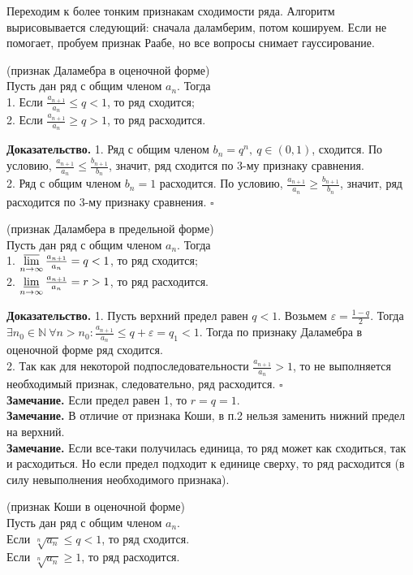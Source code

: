 Переходим к более тонким признакам сходимости ряда. Алгоритм вырисовывается 
следующий: сначала даламберим, потом кошируем. Если не помогает, пробуем 
признак Раабе, но все вопросы снимает гауссирование. 
\begin{theor} (признак Даламебра в оценочной форме)\\
Пусть дан ряд с общим членом $a_n$. Тогда\\
1. Если $\frac{a_{n+1}}{a_n}\leqslant q<1$, то ряд сходится;\\
2. Если $\frac{a_{n+1}}{a_n}\geqslant q>1$, то ряд расходится.
\end{theor}
\textbf{Доказательство.} 
1. Ряд с общим членом $b_n=q^n,~q\in(0,1)$, сходится. По условию, 
$\frac{a_{n+1}}{a_n}\leqslant \frac{b_{n+1}}{b_n}$, значит, ряд
сходится по 3-му признаку сравнения.\\
2. Ряд с общим членом $b_n=1$ расходится. По условию, 
$\frac{a_{n+1}}{a_n}\geqslant\frac{b_{n+1}}{b_n}$, значит, ряд
расходится по 3-му признаку сравнения. $\square$
\begin{theor}
    (признак Даламбера в предельной форме)\\
    Пусть дан ряд с общим членом $a_n$. Тогда\\
    1. $\varlimsup\limits_{n \to \infty}\frac{a_{n+1}}{a_n}=q<1$, 
    то ряд сходится;\\
    2. $\varliminf\limits_{n \to \infty}\frac{a_{n+1}}{a_n}=r>1$,
    то ряд расходится.
\end{theor}
\textbf{Доказательство.}  
1. Пусть верхний предел равен $q<1$. Возьмем  $\varepsilon=\frac{1-q}{2}$.
Тогда $\exists n_0\in \mathbb{N}~\forall n>n_0: \frac{a_{n+1}}{a_n}\leqslant 
q+\varepsilon=q_1<1$. Тогда по признаку Даламебра в оценочной форме ряд 
сходится.\\
2. Так как для некоторой подпоследовательности $\frac{a_{n+1}}{a_n}>1$, то
не выполняется необходимый признак, следовательно, ряд расходится. 
$\square$\\ 
\textbf{Замечание.} Если предел равен 1, то $r=q=1$.\\
\textbf{Замечание.} В отличие от признака Коши, в п.2 нельзя заменить
нижний предел на верхний.\\
\textbf{Замечание.} Если все-таки получилась единица, то ряд может как 
сходиться, так и расходиться. Но если предел подходит к единице сверху, то
ряд расходится (в силу невыполнения необходимого признака). 
\begin{theor}
    (признак Коши в оценочной форме)\\
    Пусть дан ряд с общим членом $a_n$.\\
    Если $\sqrt[n]{a_n}\leqslant q<1$, то ряд сходится.\\
    Если $\sqrt[n]{a_n}\geqslant1$, то ряд расходится.
\end{theor}
